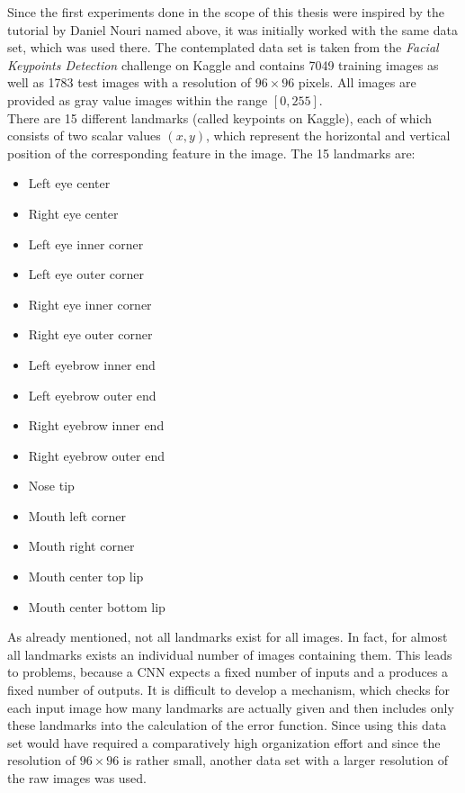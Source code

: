 \documentclass[11pt, a4paper]{article}
\begin{document}
\begin{itemize}
Since the first experiments done in the scope of this thesis were inspired by the tutorial by Daniel Nouri named above, it was initially worked with the same data set, which was used there. The contemplated data set is taken from the \emph{Facial Keypoints Detection} challenge on Kaggle and contains 7049 training images as well as 1783 test images with a resolution of $96 \times 96$ pixels. All images are provided as gray value images within the range $[0,255]$.\\
There are 15 different landmarks (called keypoints on Kaggle), each of which consists of two scalar values $(x,y)$, which represent the horizontal and vertical position of the corresponding feature in the image. The 15 landmarks are:
\begin{multicols}{2}
	\begin{itemize}[itemsep=-2ex]
		\item Left eye center
		\item Right eye center
		\item Left eye inner corner
		\item Left eye outer corner
		\item Right eye inner corner
		\item Right eye outer corner
		\item Left eyebrow inner end
		\item Left eyebrow outer end
	\end{itemize}
\columnbreak
	\begin{itemize}[itemsep=-2ex]
		\item Right eyebrow inner end
		\item Right eyebrow outer end
		\item Nose tip
		\item Mouth left corner
		\item Mouth right corner
		\item Mouth center top lip
		\item Mouth center bottom lip
	\end{itemize}
	\vphantom{}
\end{multicols}
As already mentioned, not all landmarks exist for all images. In fact, for almost all landmarks exists an individual number of images containing them. This leads to problems, because a \ac{CNN} expects a fixed number of inputs and a produces a fixed number of outputs. It is difficult to develop a mechanism, which checks for each input image how many landmarks are actually given and then includes only these landmarks into the calculation of the error function. Since using this data set would have required a comparatively high organization effort and since the resolution of $96 \times 96$ is rather small, another data set with a larger resolution of the raw images was used.


\end{itemize}
\end{document}
